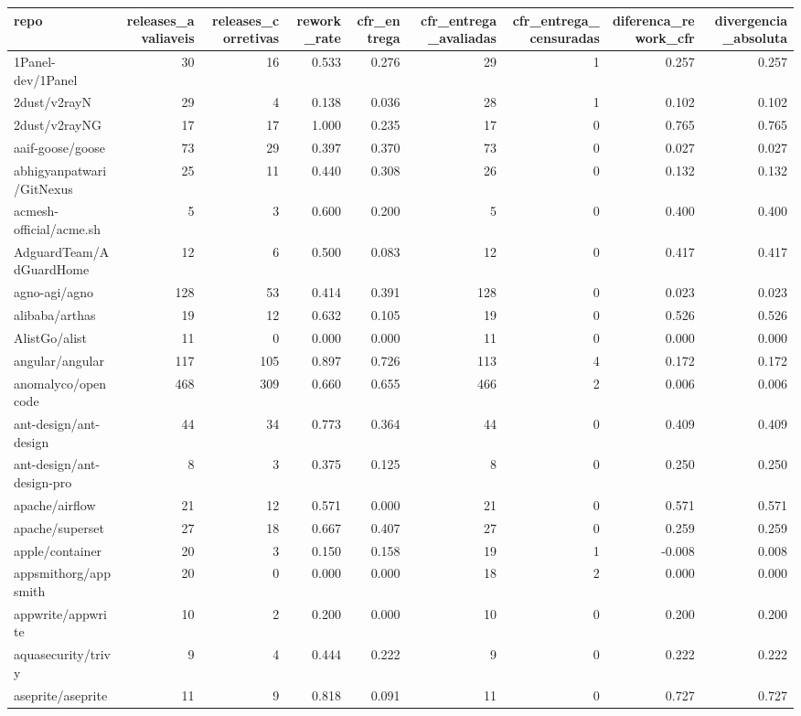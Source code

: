 \begin{tabular}{lrrrrrrrr}
\toprule
repo & releases\_avaliaveis & releases\_corretivas & rework\_rate & cfr\_entrega & cfr\_entrega\_avaliadas & cfr\_entrega\_censuradas & diferenca\_rework\_cfr & divergencia\_absoluta \\
\midrule
1Panel-dev/1Panel & 30 & 16 & 0.533 & 0.276 & 29 & 1 & 0.257 & 0.257 \\
2dust/v2rayN & 29 & 4 & 0.138 & 0.036 & 28 & 1 & 0.102 & 0.102 \\
2dust/v2rayNG & 17 & 17 & 1.000 & 0.235 & 17 & 0 & 0.765 & 0.765 \\
aaif-goose/goose & 73 & 29 & 0.397 & 0.370 & 73 & 0 & 0.027 & 0.027 \\
abhigyanpatwari/GitNexus & 25 & 11 & 0.440 & 0.308 & 26 & 0 & 0.132 & 0.132 \\
acmesh-official/acme.sh & 5 & 3 & 0.600 & 0.200 & 5 & 0 & 0.400 & 0.400 \\
AdguardTeam/AdGuardHome & 12 & 6 & 0.500 & 0.083 & 12 & 0 & 0.417 & 0.417 \\
agno-agi/agno & 128 & 53 & 0.414 & 0.391 & 128 & 0 & 0.023 & 0.023 \\
alibaba/arthas & 19 & 12 & 0.632 & 0.105 & 19 & 0 & 0.526 & 0.526 \\
AlistGo/alist & 11 & 0 & 0.000 & 0.000 & 11 & 0 & 0.000 & 0.000 \\
angular/angular & 117 & 105 & 0.897 & 0.726 & 113 & 4 & 0.172 & 0.172 \\
anomalyco/opencode & 468 & 309 & 0.660 & 0.655 & 466 & 2 & 0.006 & 0.006 \\
ant-design/ant-design & 44 & 34 & 0.773 & 0.364 & 44 & 0 & 0.409 & 0.409 \\
ant-design/ant-design-pro & 8 & 3 & 0.375 & 0.125 & 8 & 0 & 0.250 & 0.250 \\
apache/airflow & 21 & 12 & 0.571 & 0.000 & 21 & 0 & 0.571 & 0.571 \\
apache/superset & 27 & 18 & 0.667 & 0.407 & 27 & 0 & 0.259 & 0.259 \\
apple/container & 20 & 3 & 0.150 & 0.158 & 19 & 1 & -0.008 & 0.008 \\
appsmithorg/appsmith & 20 & 0 & 0.000 & 0.000 & 18 & 2 & 0.000 & 0.000 \\
appwrite/appwrite & 10 & 2 & 0.200 & 0.000 & 10 & 0 & 0.200 & 0.200 \\
aquasecurity/trivy & 9 & 4 & 0.444 & 0.222 & 9 & 0 & 0.222 & 0.222 \\
aseprite/aseprite & 11 & 9 & 0.818 & 0.091 & 11 & 0 & 0.727 & 0.727 \\

\end{tabular}
